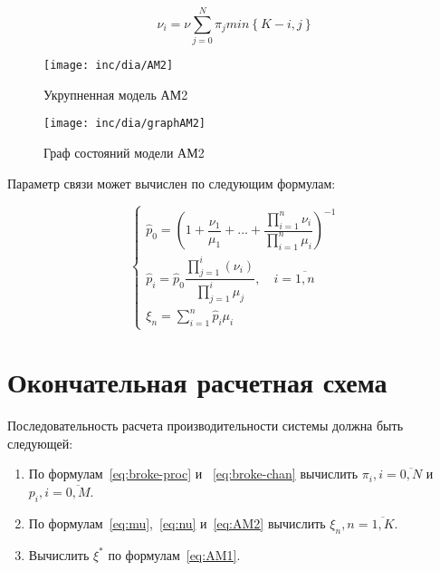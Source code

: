 \documentclass[utf8x, 12pt]{G7-32} %
\begin{document}
\begin{equation}
\label{eq:nu}
\nu_i = \nu \sum \limits_{j=0}^N \pi_j min \left\lbrace K-i, j \right\rbrace
\end{equation}



\begin{figure}[ht]
\centering
\texttt{[image: inc/dia/AM2]}
\caption{Укрупненная модель АМ2}
\label{fig:AM2}
\end{figure}

\begin{figure}[ht]
\centering
\texttt{[image: inc/dia/graphAM2]}
\caption{Граф состояний модели АМ2}
\label{fig:graphAM2}
\end{figure}


Параметр связи может вычислен по следующим формулам:


\begin{equation}
\label{eq:AM2}
\left\{
   \begin{array}{lcl}
	\hat{p}_{0} = \left( 1 + \dfrac{\nu_1}{\mu_1} +  ... + \dfrac{\prod \limits_{i=1}^n \nu_i}{\prod \limits_{i=1}^n \mu_i} \right) ^{-1} \\
	\hat{p}_{i} = \hat{p}_{0} \dfrac{\prod \limits_{j=1}^{i} (\nu_i)}{\prod \limits_{j=1}^i \mu_{j}}, \quad i = \overline{1,n}  \\ 
	\xi_n = \sum \limits_{i=1}^n \hat{p}_i \mu_i
   \end{array}
\right.
\end{equation}


\section{Окончательная расчетная схема}
Последовательность расчета производительности системы должна быть следующей:

\begin{enumerate}
\item По формулам~\ref{eq:broke-proc} и ~\ref{eq:broke-chan} вычислить $\pi_i, i=\overline{0,N}$ и $p_i, i=\overline{0,M} $.
\item По формулам~\ref{eq:mu},~\ref{eq:nu} и~\ref{eq:AM2} вычислить $\xi_n, n=\overline{1,K}$.
\item Вычислить $\xi^{*}$ по формулам~\ref{eq:AM1}.
\end{enumerate}

\mainmatter %


\backmatter %



\appendix   %
\end{document}
